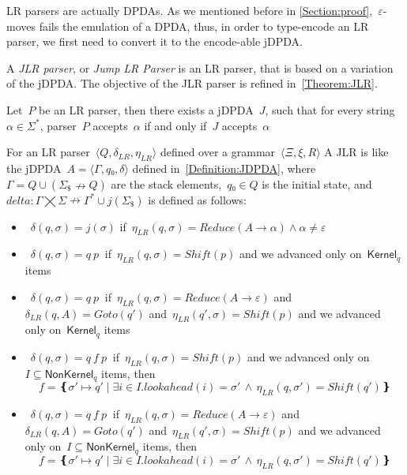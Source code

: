 LR parsers are actually DPDAs\@. As we mentioned before in \cref{Section:proof},~$ε$-moves
  fails the emulation of a DPDA, thus, in order to type-encode an LR parser, we first need
  to convert it to the encode-able jDPDA\@.

A \emph{JLR parser}, or \emph{Jump LR Parser} is an LR parser, that
  is based on a variation of the jDPDA\@.
The objective of the JLR parser is refined in~\cref{Theorem:JLR}.

\begin{Theorem}
  \label{Theorem:JLR}
  Let~$P$ be an LR parser, then there exists a jDPDA~$J$,
  such that for every string~$α∈Σ^*$, parser~$P$ accepts~$α$
    if and only if~$J$ accepts~$α$
\end{Theorem}

For an LR parser~$⟨Q,δ_{LR}, η_{LR}⟩$ defined over a grammar~$⟨Ξ,ξ,R⟩$
A JLR is like the jDPDA~$A=⟨Γ,q₀,δ⟩$ defined in~\cref{Definition:JDPDA},
  where~$Γ= Q∪(Σ_\$↛Q)$ are the stack elements,~$q₀∈Q$
  is the initial state, and~$delta:Γ⨉Σ↛Γ^*∪j(Σ_\$)$ is defined as follows:
  \begin{itemize}
   \item~$δ(q,σ)= j(σ)$ if~$η_{LR}(q,σ)=Reduce(A→α)∧α≠ε$


   \item~$δ(q,σ)= q \: p~$ if~$η_{LR}(q,σ)=Shift(p)$ and we advanced only on~$\textsf{Kernel}_q$ items
   \item~$δ(q,σ)= q \: p~$ if~$η_{LR}(q,σ)=Reduce(A→ε)$
     and~$δ_{LR}(q,A)=Goto(q')$ and~$η_{LR}(q',σ)=Shift(p)$
     and we advanced only on~$\textsf{Kernel}_q$ items


   \item~$δ(q,σ)= q \: f \: p~$ if~$η_{LR}(q,σ)=Shift(p)$ and we advanced only on~$I⊆\textsf{NonKernel}_q$
     items, then
    \[
      f = ❴σ'↦q' \; | \;∃i∈I. lookahead(i)=σ' \,∧\, η_{LR}(q,σ')=Shift(q')❵
    \]

   \item~$δ(q,σ)= q \: f \: p~$ if~$η_{LR}(q,σ)=Reduce(A→ε)$
     and~$δ_{LR}(q,A)=Goto(q')$ and~$η_{LR}(q',σ)=Shift(p)$
     and we advanced only on~$I⊆\textsf{NonKernel}_q$
     items, then
     \[
      f = ❴σ'↦q' \; | \;∃i∈I. lookahead(i)=σ' \,∧\, η_{LR}(q,σ')=Shift(q')❵
     \]

  \end{itemize}
